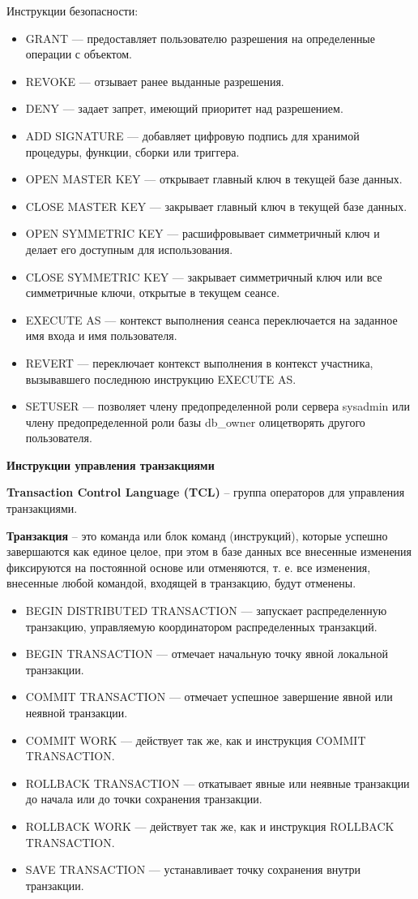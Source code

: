 Инструкции безопасности:
\begin{itemize}
	\item GRANT — предоставляет пользователю разрешения на определенные операции с объектом.
	\item REVOKE — отзывает ранее выданные разрешения.
	\item DENY — задает запрет, имеющий приоритет над разрешением.
	\item ADD SIGNATURE — добавляет цифровую подпись для хранимой процедуры, функции, сборки или
	триггера.
	\item OPEN MASTER KEY — открывает главный ключ в текущей базе данных.
	\item CLOSE MASTER KEY — закрывает главный ключ в текущей базе данных.
	\item OPEN SYMMETRIC KEY — расшифровывает симметричный ключ и делает его доступным для использования.
	\item CLOSE SYMMETRIC KEY — закрывает симметричный ключ или все симметричные ключи, открытые
	в текущем сеансе.
	\item EXECUTE AS — контекст выполнения сеанса переключается на заданное имя входа и имя пользователя.
	\item REVERT — переключает контекст выполнения в контекст участника, вызывавшего последнюю инструкцию EXECUTE AS.
	\item SETUSER — позволяет члену предопределенной роли сервера sysadmin или члену предопределенной роли базы db\_owner олицетворять
	другого пользователя.
\end{itemize}

\textbf{Инструкции управления транзакциями}

\textbf{Transaction Control Language (TCL)} – группа операторов для управления транзакциями.

\textbf{Транзакция} – это команда или блок команд (инструкций), которые успешно завершаются как единое целое, при этом в базе данных все внесенные изменения фиксируются на постоянной основе или отменяются, т. е. все изменения, внесенные любой командой, входящей в транзакцию, будут отменены.
\begin{itemize}
	\item BEGIN DISTRIBUTED TRANSACTION — запускает распределенную транзакцию, управляемую координатором распределенных транзакций.
	\item BEGIN TRANSACTION — отмечает начальную точку явной локальной транзакции.
	\item COMMIT TRANSACTION — отмечает успешное завершение явной или неявной транзакции.
	\item COMMIT WORK — действует так же, как и инструкция COMMIT TRANSACTION.
	\item ROLLBACK TRANSACTION — откатывает явные или неявные транзакции до начала или до точки
	сохранения транзакции.
	\item ROLLBACK WORK — действует так же, как и инструкция ROLLBACK TRANSACTION.
	\item SAVE TRANSACTION — устанавливает точку сохранения внутри транзакции.
\end{itemize}



